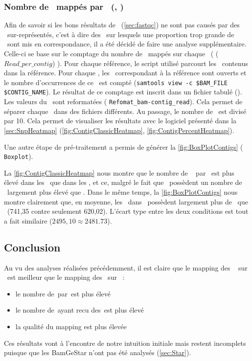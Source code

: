 \documentclass[../main]{subfiles} %
\begin{document}
\subsubsection{Nombre de \reads mappés par \contigs (\BamTrEx, \BamTrMo)}
\label{sec:NbReadsParCotigs}
Afin de savoir si les bons résultats de \TrEx (\cref{sec:fastqc}) ne sont pas causés par des \contigs sur-représentés, c'est à dire des \contigs sur lesquels une proportion trop grande de \reads sont mis en correspondance, il a été décidé de faire une analyse supplémentaire. Celle-ci  se base sur le  comptage du nombre de \reads mappés sur chaque \contigs (\cite{florent_f-marchalm1bioinfointernship2024-inrae_agap_ge2pop_2024} ($Read\_per\_contig$) ). Pour chaque référence, le script utilisé parcourt les \contigs contenus dans la référence. Pour chaque  \contig, les \bam correspondant à la référence sont ouverts et le nombre d'occurrences de ce \contig est compté (\lstinline{samtools view -c $BAM_FILE $CONTIG_NAME}). Le résultat de ce comptage est inscrit dans un fichier tabulé (\tsv). Les valeurs du \tsv sont reformatées (\cite{florent_f-marchalm1bioinfointernship2024-inrae_agap_ge2pop_2024} \lstinline{Refomat_bam-contig_read}). Cela permet de séparer chaque \bam dans des fichiers différents. Au passage, le nombre de \reads est divisé par 10. Cela permet de visualiser les résultats avec le logiciel présenté dans la \cref{sec:SnpHeatmap} (\cref{fig:ContigClassicHeatmap}, \cref{fig:ContigPercentHeatmap}).

Une autre étape de pré-traitement a permis de générer la \cref{fig:BoxPlotContigs} (\cite{florent_f-marchalm1bioinfointernship2024-inrae_agap_ge2pop_2024} \lstinline{Boxplot}).

La \cref{fig:ContigClassicHeatmap} nous montre que le nombre de \reads  par \contigs est plus élevé dans les \BamTrEx que dans les \BamTrMo, et ce, malgré le fait que \TrMo possèdent un nombre de \contigs largement plus élevé que \TrEx. Dans le même temps, la \cref{fig:BoxPlotContigs} nous montre clairement que, en moyenne, les \contig dans \BamTrEx possèdent largement plus de \reads que \BamTrMo (741,35 contre seulement 620,02). L'écart type entre les deux conditions est tout a fait similaire ($2495,10 \approx 2481.73$).





\subsection{Conclusion}
\label{sec:MapConclusion}
Au vu des analyses réalisées précédemment, il est claire que le \gls{mapping} des \fastq  sur \TrEx est meilleur que le \gls{mapping} des \fastq sur \TrMo :
\begin{itemize}
    \item le nombre de \reads\,par \contigs\,est plus élevé 
    \item le nombre de \contigs\,ayant recu des \reads\,est plus élevé 
    \item la qualité du \gls{mapping} est plus élevée
\end{itemize}

Ces résultats vont à l'encontre de notre intuition initiale mais restent incomplets puisque que les \acrshort{BamGeStar} n'ont pas été analysés (\cref{sec:Star}).

\end{document}
